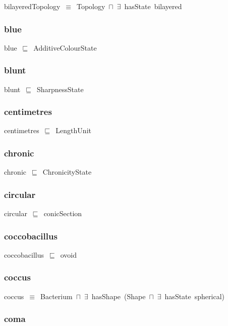 \documentclass{article}
\begin{document}
bilayeredTopology~\ensuremath{\equiv}~Topology~\ensuremath{\sqcap}~\ensuremath{\exists}~hasState~bilayered

\subsubsection*{blue}

blue~\ensuremath{\sqsubseteq}~AdditiveColourState~

\subsubsection*{blunt}

blunt~\ensuremath{\sqsubseteq}~SharpnessState~

\subsubsection*{centimetres}

centimetres~\ensuremath{\sqsubseteq}~LengthUnit~

\subsubsection*{chronic}

chronic~\ensuremath{\sqsubseteq}~ChronicityState~

\subsubsection*{circular}

circular~\ensuremath{\sqsubseteq}~conicSection~

\subsubsection*{coccobacillus}

coccobacillus~\ensuremath{\sqsubseteq}~ovoid~

\subsubsection*{coccus}

coccus~\ensuremath{\equiv}~Bacterium~\ensuremath{\sqcap}~\ensuremath{\exists}~hasShape~(Shape~\ensuremath{\sqcap}~\ensuremath{\exists}~hasState~spherical)

\subsubsection*{coma}
\end{document}
